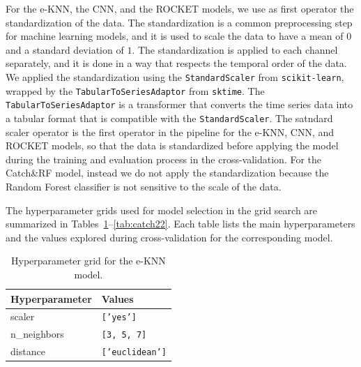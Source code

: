 \documentclass[a4paper,11pt]{article}
\begin{document}
For the e-KNN, the CNN, and the ROCKET models, we use as first operator the standardization of the data.
The standardization is a common preprocessing step for machine learning models,
and it is used to scale the data to have a mean of $0$ and a standard deviation of $1$.
The standardization is applied to each channel separately, and it is done in a way that respects the temporal order of the data.
We applied the standardization using the \texttt{StandardScaler} from \texttt{scikit-learn},
wrapped by the \texttt{TabularToSeriesAdaptor} from \texttt{sktime}.
The \texttt{TabularToSeriesAdaptor} is a transformer that converts the time series data into a tabular format
that is compatible with the \texttt{StandardScaler}.
The satndard scaler operator is the first operator in the pipeline for the e-KNN, CNN, and ROCKET models,
so that the data is standardized before applying the model
during the training and evaluation process in the cross-validation.
For the Catch\&RF model, instead we do not apply the standardization
because the Random Forest classifier is not sensitive to the scale of the data.

The hyperparameter grids used for model selection in the grid search are summarized in Tables~\ref{tab:e-knn}--\ref{tab:catch22}.
Each table lists the main hyperparameters and the values explored during cross-validation for the corresponding model.

\begin{table}[htbp]
    \centering
    \begin{tabular}{|l|l|}
        \hline
        \textbf{Hyperparameter} & \textbf{Values} \\
        \hline
        scaler & \texttt{['yes']} \\
        n\_neighbors & \texttt{[3, 5, 7]} \\
        distance & \texttt{['euclidean']} \\
        \hline
    \end{tabular}
    \caption{Hyperparameter grid for the e-KNN model.}
    \label{tab:e-knn}
\end{table}
\end{document}
